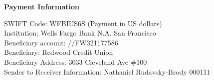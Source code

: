 \documentclass[11pt]{article}
\begin{document}
\vspace{\fill}

\textbf{Payment Information}

{\small
SWIFT Code: WFBIUS6S (Payment in US dollars) \\
Institution: Wells Fargo Bank N.A. San Francisco\\
Beneficiary account: //FW321177586\\
Beneficiary: Redwood Credit Union\\
Beneficiary Address: 3033 Cleveland Ave \#100\\
Sender to Receiver Information: Nathaniel Rudavsky-Brody 000111
}
\end{document}
